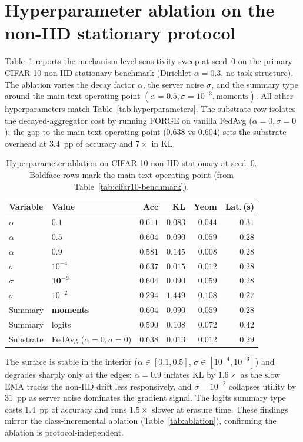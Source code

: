 \section{Hyperparameter ablation on the non-IID stationary protocol}
\label{app:ablation-noniid}

Table~\ref{tab:ablation-noniid} reports the mechanism-level sensitivity sweep at
seed~$0$ on the primary CIFAR-10 non-IID stationary benchmark (Dirichlet
$\alpha{=}0.3$, no task structure). The ablation varies the decay factor
$\alpha$, the server noise $\sigma$, and the summary type around the main-text
operating point $(\alpha{=}0.5, \sigma{=}10^{-3}, \mathrm{moments})$. All other
hyperparameters match Table~\ref{tab:hyperparameters}. The substrate row isolates
the decayed-aggregator cost by running FORGE on vanilla FedAvg ($\alpha{=}0,
\sigma{=}0$); the gap to the main-text operating point ($0.638$ vs $0.604$) sets
the substrate overhead at $3.4$~pp of accuracy and $7\times$ in KL.

\begin{table}[h]
\centering
\scriptsize
\setlength{\tabcolsep}{3pt}
\begin{tabular}{llrrrr}
\toprule
Variable & Value & Acc & KL & Yeom & Lat.\,(s) \\
\midrule
$\alpha$ & $0.1$              & $0.611$ & $0.083$ & $0.044$ & $0.31$ \\
$\alpha$ & $\mathbf{0.5}$     & $\mathbf{0.604}$ & $\mathbf{0.090}$ & $\mathbf{0.059}$ & $\mathbf{0.28}$ \\
$\alpha$ & $0.9$              & $0.581$ & $0.145$ & $0.008$ & $0.28$ \\
\midrule
$\sigma$ & $10^{-4}$          & $0.637$ & $0.015$ & $0.012$ & $0.28$ \\
$\sigma$ & $\mathbf{10^{-3}}$ & $\mathbf{0.604}$ & $\mathbf{0.090}$ & $\mathbf{0.059}$ & $\mathbf{0.28}$ \\
$\sigma$ & $10^{-2}$          & $0.294$ & $1.449$ & $0.108$ & $0.27$ \\
\midrule
Summary & \textbf{moments}    & $\mathbf{0.604}$ & $\mathbf{0.090}$ & $\mathbf{0.059}$ & $\mathbf{0.28}$ \\
Summary & logits              & $0.590$ & $0.108$ & $0.072$ & $0.42$ \\
\midrule
Substrate & FedAvg ($\alpha{=}0, \sigma{=}0$) & $0.638$ & $0.013$ & $0.012$ & $0.29$ \\
\bottomrule
\end{tabular}
\caption{Hyperparameter ablation on CIFAR-10 non-IID stationary at seed~$0$.
Boldface rows mark the main-text operating point (from
Table~\ref{tab:cifar10-benchmark}).}
\label{tab:ablation-noniid}
\end{table}

The surface is stable in the interior ($\alpha \in [0.1, 0.5]$, $\sigma \in
[10^{-4}, 10^{-3}]$) and degrades sharply only at the edges: $\alpha{=}0.9$
inflates KL by $1.6\times$ as the slow EMA tracks the non-IID drift less
responsively, and $\sigma{=}10^{-2}$ collapses utility by $31$~pp as server
noise dominates the gradient signal. The logits summary type costs $1.4$~pp of
accuracy and runs $1.5\times$ slower at erasure time. These findings mirror the
class-incremental ablation (Table~\ref{tab:ablation}), confirming the ablation
is protocol-independent.
